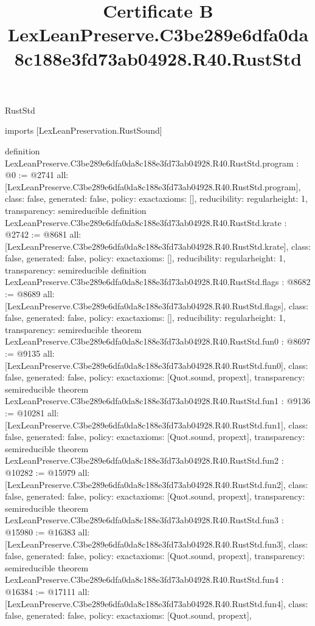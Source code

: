 \begin{lexlean}{RustStd}
\title{Certificate B LexLeanPreserve.C3be289e6dfa0da8c188e3fd73ab04928.R40.RustStd}
\begin{coremodule}
imports [LexLeanPreservation.RustSound]

definition LexLeanPreserve.C3be289e6dfa0da8c188e3fd73ab04928.R40.RustStd.program : @0 := @2741 {
  all: [LexLeanPreserve.C3be289e6dfa0da8c188e3fd73ab04928.R40.RustStd.program],
  class: false,
  generated: false,
  policy: exact{axioms: []},
  reducibility: regular{height: 1},
  transparency: semireducible
}
definition LexLeanPreserve.C3be289e6dfa0da8c188e3fd73ab04928.R40.RustStd.krate : @2742 := @8681 {
  all: [LexLeanPreserve.C3be289e6dfa0da8c188e3fd73ab04928.R40.RustStd.krate],
  class: false,
  generated: false,
  policy: exact{axioms: []},
  reducibility: regular{height: 1},
  transparency: semireducible
}
definition LexLeanPreserve.C3be289e6dfa0da8c188e3fd73ab04928.R40.RustStd.flags : @8682 := @8689 {
  all: [LexLeanPreserve.C3be289e6dfa0da8c188e3fd73ab04928.R40.RustStd.flags],
  class: false,
  generated: false,
  policy: exact{axioms: []},
  reducibility: regular{height: 1},
  transparency: semireducible
}
theorem LexLeanPreserve.C3be289e6dfa0da8c188e3fd73ab04928.R40.RustStd.fun0 : @8697 := @9135 {
  all: [LexLeanPreserve.C3be289e6dfa0da8c188e3fd73ab04928.R40.RustStd.fun0],
  class: false,
  generated: false,
  policy: exact{axioms: [Quot.sound, propext]},
  transparency: semireducible
}
theorem LexLeanPreserve.C3be289e6dfa0da8c188e3fd73ab04928.R40.RustStd.fun1 : @9136 := @10281 {
  all: [LexLeanPreserve.C3be289e6dfa0da8c188e3fd73ab04928.R40.RustStd.fun1],
  class: false,
  generated: false,
  policy: exact{axioms: [Quot.sound, propext]},
  transparency: semireducible
}
theorem LexLeanPreserve.C3be289e6dfa0da8c188e3fd73ab04928.R40.RustStd.fun2 : @10282 := @15979 {
  all: [LexLeanPreserve.C3be289e6dfa0da8c188e3fd73ab04928.R40.RustStd.fun2],
  class: false,
  generated: false,
  policy: exact{axioms: [Quot.sound, propext]},
  transparency: semireducible
}
theorem LexLeanPreserve.C3be289e6dfa0da8c188e3fd73ab04928.R40.RustStd.fun3 : @15980 := @16383 {
  all: [LexLeanPreserve.C3be289e6dfa0da8c188e3fd73ab04928.R40.RustStd.fun3],
  class: false,
  generated: false,
  policy: exact{axioms: [Quot.sound, propext]},
  transparency: semireducible
}
theorem LexLeanPreserve.C3be289e6dfa0da8c188e3fd73ab04928.R40.RustStd.fun4 : @16384 := @17111 {
  all: [LexLeanPreserve.C3be289e6dfa0da8c188e3fd73ab04928.R40.RustStd.fun4],
  class: false,
  generated: false,
  policy: exact{axioms: [Quot.sound, propext]},
}
\end{coremodule}
\end{lexlean}
